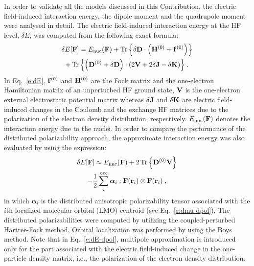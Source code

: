 \documentclass[aip,amsmath,amssymb,reprint,floatfix]{revtex4-1}
\newcommand{\tbraket}[3]{\ensuremath{\bigl\langle {#1} \bigl\lvert {#2} \bigl\lvert {#3} \bigr\rangle}}
\newcommand{\BM}[1]{\bm{#1}}
\DeclareMathOperator{\Tr}{Tr}
\begin{document}
In order to validate all the models discussed in this Contribution,
the electric field\hyp{}induced interaction energy, 
the dipole moment and the quadrupole moment were analysed in detail.
The electric field\hyp{}induced interaction energy at the HF level, $\delta E$,
was computed from the following exact formula:
%
\begin{multline}\label{e:dE}
 \delta E[{\bf F}] = E_{\rm nuc}({\bf F}) +
                     \Tr{\left\{ \delta {\bf D} \cdot
                                \left( {\bf H}^{(0)} + {\bf f}^{(0)} \right) \right\}} \\
                   + \Tr{\left\{ \left( {\bf D}^{(0)} + \delta {\bf D} \right) \cdot
                                \left( 2{\bf V} + 2\delta {\bf J} - \delta {\bf K}\right) \right\}} \;.
\end{multline}
%
In Eq.~\eqref{e:dE}, ${\bf f}^{(0)}$ and ${\bf H}^{(0)}$ are the Fock matrix and 
the one\hyp{}electron Hamiltonian matrix of an unperturbed HF ground state,
${\bf V}$ is the one\hyp{}electron external electrostatic potential matrix whereas $\delta {\bf J}$
and $\delta {\bf K}$ are electric field\hyp{}induced changes in the Coulomb and the exchange HF matrices due to 
the polarization of the electron density distribution, respectively. $E_{\rm nuc}({\bf F})$ denotes the interaction energy
due to the nuclei.
In order to compare the performance of the distributed polarizability approach,
the approximate interaction energy was also evaluated by using the expression:
%
\begin{multline}\label{e:dE-dpol}
 \delta E[{\bf F}] \approx E_{\rm nuc}({\bf F}) + 
                     2 \Tr{\left\{ {\bf D}^{(0)} {\bf V}\right\} }  \\
                   - \frac{1}{2} \sum_i^{\rm occ} {\BM \alpha}_i : {\bf F}({\bf r}_i) \otimes {\bf F}({\bf r}_i) \;,
\end{multline}
%
in which ${\BM \alpha}_i$ is the distributed anisotropic polarizability tensor associated with the
$i$th localized molecular orbital (LMO) centroid (see Eq.~\eqref{e:dmu-dpol}). 
The distributed polarizabilities were computed by utilizing the coupled\hyp{}perturbed Hartree\hyp{}Fock
method.\cite{McWeeny.RevModPhys.1960,Dodds.McWeeney.Sadlej.MolPhys.1977} 
Orbital localization was performed by using the Boys method.\cite{Boys.RevModPhys.1960} 
Note that in Eq.~\eqref{e:dE-dpol}, 
multipole approximation is introduced only for the part associated with the electric field\hyp{}induced
change in the one\hyp{}particle density matrix, i.e., the polarization of the electron density distribution.
\end{document}
